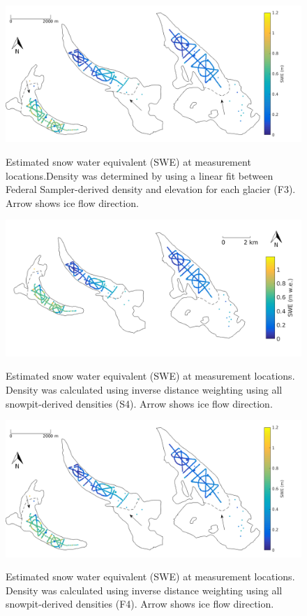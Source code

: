 \documentclass[12pt]{article}
\begin{document}
\begin{figure}[H]
	\centering
	\includegraphics[width = \textwidth]{SWEmap_opt7.png}\\
	\caption{Estimated snow water equivalent (SWE) at measurement locations.Density was determined by using a linear fit between Federal Sampler-derived density and elevation for each glacier (F3). Arrow shows ice flow direction.}
	\label{fig:SWEmap_F3}
\end{figure}

\begin{figure}[H]
	\centering
	\includegraphics[width = \textwidth]{SWEmap_opt8.png}\\
	\caption{Estimated snow water equivalent (SWE) at measurement locations. Density was calculated using inverse distance weighting using all snowpit-derived densities (S4). Arrow shows ice flow direction.}
	\label{fig:SWEmap_S4}
\end{figure}

\begin{figure}[H]
	\centering
	\includegraphics[width =\textwidth]{SWEmap_opt9.png}\\
	\caption{Estimated snow water equivalent (SWE) at measurement locations. Density was calculated using inverse distance weighting using all snowpit-derived densities (F4). Arrow shows ice flow direction.}
	\label{fig:SWEmap_F4}
\end{figure}
\end{document}
